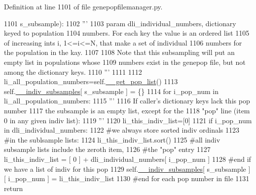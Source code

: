 Definition at line 1101 of file genepopfilemanager.\+py.


\begin{DoxyCode}
1101             s\_subsample):
1102         \textcolor{stringliteral}{'''}
1103 \textcolor{stringliteral}{        param dli\_individual\_numbers, dictionary keyed to population}
1104 \textcolor{stringliteral}{                numbers.  For each key the value is an ordered list}
1105 \textcolor{stringliteral}{                of increasing ints i, 1<=i<=N, that make a set of individual}
1106 \textcolor{stringliteral}{                numbers for the population in the kay.}
1107 \textcolor{stringliteral}{}
1108 \textcolor{stringliteral}{        Note that this subsampling will put an empty list in populations whose}
1109 \textcolor{stringliteral}{        numbers exist in the genepop file, but not among the dictionary keys.}
1110 \textcolor{stringliteral}{        '''}
1111 
1112         li\_all\_population\_numbers=self.\hyperlink{classnegui_1_1genepopfilemanager_1_1GenepopFileManager_a0cd3178624c652968b4d319f12e5df6e}{\_\_get\_pop\_list}()
1113         self.\hyperlink{classnegui_1_1genepopfilemanager_1_1GenepopFileManager_a1e8379bcee4902ca9314ff53fcb71644}{\_\_indiv\_subsamples}[ s\_subsample ] = \{\}
1114         \textcolor{keywordflow}{for} i\_pop\_num \textcolor{keywordflow}{in} li\_all\_population\_numbers:
1115             \textcolor{stringliteral}{'''}
1116 \textcolor{stringliteral}{            If caller's dictionary keys lack this pop number}
1117 \textcolor{stringliteral}{            the subsample is an empty list, except for the}
1118 \textcolor{stringliteral}{            "pop" line (item 0 in any given indiv list):}
1119 \textcolor{stringliteral}{            '''}
1120             li\_this\_indiv\_list=[0]
1121             \textcolor{keywordflow}{if} i\_pop\_num \textcolor{keywordflow}{in} dli\_individual\_numbers:
1122                 \textcolor{comment}{#we always store sorted indiv ordinals}
1123                 \textcolor{comment}{#in the sublsample lists:}
1124                 li\_this\_indiv\_list.sort()
1125                 \textcolor{comment}{#all indiv subsample lists include the zeroth item,}
1126                 \textcolor{comment}{#the "pop" entry}
1127                 li\_this\_indiv\_list =  [ 0 ] +  dli\_individual\_numbers[ i\_pop\_num ] 
1128             \textcolor{comment}{#end if we have a list of indiv for this pop}
1129             self.\hyperlink{classnegui_1_1genepopfilemanager_1_1GenepopFileManager_a1e8379bcee4902ca9314ff53fcb71644}{\_\_indiv\_subsamples}[ s\_subsample ] [ i\_pop\_num ] = li\_this\_indiv\_list
1130         \textcolor{comment}{#end for each pop number in file}
1131         \textcolor{keywordflow}{return}
\end{DoxyCode}
